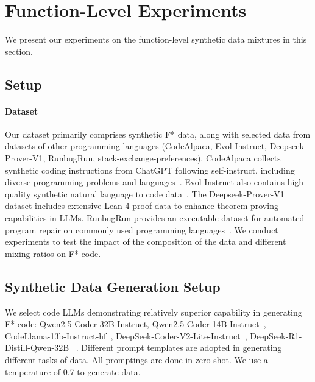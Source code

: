 \section{Function-Level Experiments}
We present our experiments on the function-level synthetic data mixtures in this section.
\subsection{Setup}
\paragraph{Dataset}
Our dataset primarily comprises synthetic F* data, along with selected data from datasets of other programming languages (CodeAlpaca, Evol-Instruct, Deepseek-Prover-V1, RunbugRun, stack-exchange-preferences). CodeAlpaca collects synthetic coding instructions from ChatGPT following self-instruct, including diverse programming problems and languages~\cite{codealpaca}. Evol-Instruct also contains high-quality synthetic natural language to code data~\cite{wei2024magicoder}. The Deepseek-Prover-V1~\cite{xin2024deepseek} dataset includes extensive Lean 4 proof data to enhance theorem-proving capabilities in LLMs. RunbugRun provides an executable dataset for automated program repair on commonly used programming languages~\cite{prenner2023runbugrun}. 
We conduct experiments to test the impact of the composition of the data and different mixing ratios on  F* code.
\subsection {Synthetic Data Generation Setup}
We select code LLMs demonstrating relatively superior capability in generating F* code: Qwen2.5-Coder-32B-Instruct, Qwen2.5-Coder-14B-Instruct~\cite{hui2024qwen2}, CodeLlama-13b-Instruct-hf~\cite{roziere2023code}, 
DeepSeek-Coder-V2-Lite-Instruct~\cite{liu2024deepseek}, 
DeepSeek-R1-Distill-Qwen-32B ~\cite{guo2025deepseek}. Different prompt templates are adopted in generating different tasks of data. All promptings are done in zero shot. We use a temperature of 0.7 to generate data.  


